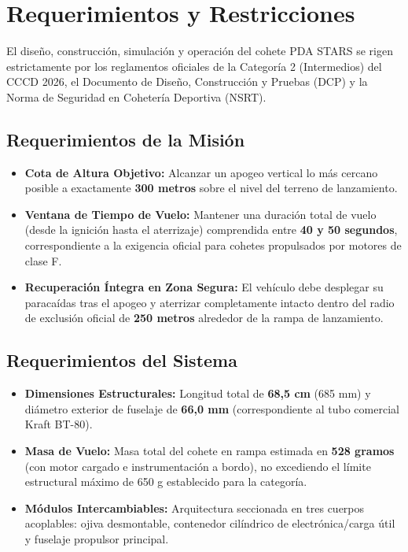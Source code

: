 \section{Requerimientos y Restricciones}

El diseño, construcción, simulación y operación del cohete PDA STARS se rigen estrictamente por los reglamentos oficiales de la Categoría 2 (Intermedios) del CCCD 2026, el Documento de Diseño, Construcción y Pruebas (DCP) y la Norma de Seguridad en Cohetería Deportiva (NSRT).

\subsection{Requerimientos de la Misión}
\begin{itemize}[leftmargin=1.5em]
    \item \textbf{Cota de Altura Objetivo:} Alcanzar un apogeo vertical lo más cercano posible a exactamente \textbf{300 metros} sobre el nivel del terreno de lanzamiento.
    \item \textbf{Ventana de Tiempo de Vuelo:} Mantener una duración total de vuelo (desde la ignición hasta el aterrizaje) comprendida entre \textbf{40 y 50 segundos}, correspondiente a la exigencia oficial para cohetes propulsados por motores de clase F.
    \item \textbf{Recuperación Íntegra en Zona Segura:} El vehículo debe desplegar su paracaídas tras el apogeo y aterrizar completamente intacto dentro del radio de exclusión oficial de \textbf{250 metros} alrededor de la rampa de lanzamiento.
\end{itemize}

\subsection{Requerimientos del Sistema}
\begin{itemize}[leftmargin=1.5em]
    \item \textbf{Dimensiones Estructurales:} Longitud total de \textbf{68,5 cm} (685 mm) y diámetro exterior de fuselaje de \textbf{66,0 mm} (correspondiente al tubo comercial Kraft BT-80).
    \item \textbf{Masa de Vuelo:} Masa total del cohete en rampa estimada en \textbf{528 gramos} (con motor cargado e instrumentación a bordo), no excediendo el límite estructural máximo de 650 g establecido para la categoría.
    \item \textbf{Módulos Intercambiables:} Arquitectura seccionada en tres cuerpos acoplables: ojiva desmontable, contenedor cilíndrico de electrónica/carga útil y fuselaje propulsor principal.
\end{itemize}

